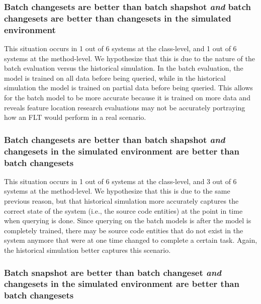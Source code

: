 %
%
\subsubsection{Batch changesets are better than batch shapshot
\emph{and} batch changesets are better than changesets in the simulated environment}

%

This situation occurs in
1 out of 6 systems at the class-level, and
1 out of 6 systems at the method-level.
We hypothesize that this is due to the nature of the batch evaluation versus the historical simulation.
In the batch evaluation, the model is trained on all data before being queried,
while in the historical simulation the model is trained on partial data before being queried.
This allows for the batch model to be more accurate because it is trained on more data
and reveals feature location research evaluations may not be accurately portraying
how an FLT would perform in a real scenario.

\subsubsection{Batch changesets are better than batch shapshot
\emph{and} changesets in the simulated environment are better than batch changesets}

%

This situation occurs in
1 out of 6 systems at the class-level, and
3 out of 6 systems at the method-level.
We hypothesize that this is due to the same previous reason, but that
historical simulation more accurately captures the correct state of the system (i.e., the source code entities)
at the point in time when querying is done.
Since querying on the batch models is after the model is completely trained,
there may be source code entities that do not exist in the system anymore
that were at one time changed to complete a certain task.
Again, the historical simulation better captures this scenario.

\subsubsection{Batch snapshot are better than batch changeset
\emph{and} changesets in the simulated environment are better than batch changesets}

